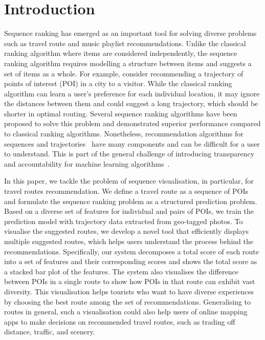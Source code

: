 
\section{Introduction}
Sequence ranking has emerged as an important tool for solving diverse problems such as travel route and music playlist recommendations. 
Unlike the classical ranking algorithm where items are considered independently, the sequence ranking algorithm requires modelling a structure between items and suggests a set of items as a whole. 
For example, consider recommending a trajectory of points of interest (POI) in a city to a visitor. 
While the classical ranking algorithm can learn a user's preference for each individual location, it may ignore the distances between them and could suggest a long trajectory, which should be shorter in optimal routing. 
Several sequence ranking algorithms have been proposed to solve this problem and demonstrated superior performance compared to classical ranking algorithms. 
Nonetheless, recommendation algorithms for sequences and trajectories~\cite{chen2016learning,chen2017SR} have many components and can be difficult for a user to understand. This is part of the general challenge of introducing transparency and accountability for machine learning algorithms~\cite{fatml}. 

In this paper, we tackle the problem of sequence visualisation, in particular, for travel routes recommendation. 
We define a travel route as a sequence of POIs and formulate the sequence ranking problem as a structured prediction problem. 
Based on a diverse set of features for individual and pairs of POIs, we train the prediction model with trajectory data extracted from geo-tagged photos. 
To visualise the suggested routes, we develop a novel tool that efficiently displays multiple suggested routes, which helps users understand the process behind the recommendations.
Specifically, our system decomposes a total score of each route into a set of features and their corresponding scores and shows the total score as a stacked bar plot of the features.
The system also visualises the difference between POIs in a single route to show how POIs in that route can exhibit vast diversity. 
This visualisation helps tourists who want to have diverse experiences by choosing the best route among the set of recommendations. Generalising to routes in general, such a visualisation could also help users of online mapping apps to make decisions on recommended travel routes, such as trading off distance, traffic, and scenery. 
